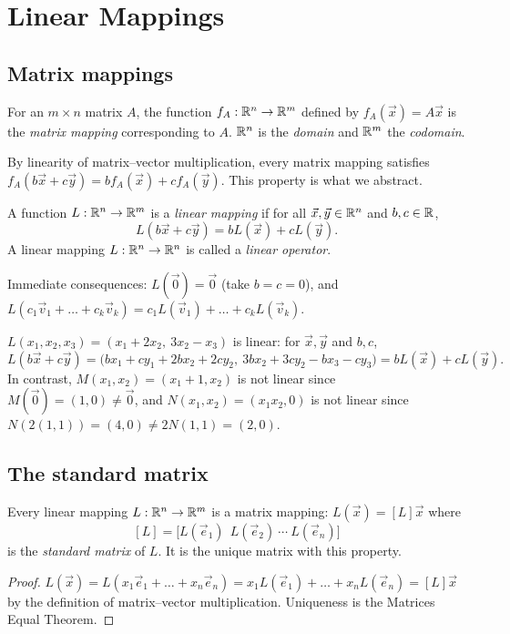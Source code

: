\chapter{Linear Mappings}

\section{Matrix mappings}

\begin{definition}
For an $m\times n$ matrix $A$, the function $f_A:\mathbb{R}^n\to\mathbb{R}^m$ defined by $f_A(\vec x)=A\vec x$ is the
\emph{matrix mapping} corresponding to $A$. $\mathbb{R}^n$ is the \emph{domain} and $\mathbb{R}^m$ the
\emph{codomain}.
\end{definition}

By linearity of matrix--vector multiplication, every matrix mapping satisfies
$f_A(b\vec x+c\vec y)=bf_A(\vec x)+cf_A(\vec y)$. This property is what we abstract.

\begin{definition}
A function $L:\mathbb{R}^n\to\mathbb{R}^m$ is a \emph{linear mapping} if for all $\vec x,\vec y\in\mathbb{R}^n$ and
$b,c\in\mathbb{R}$,
\[
  L(b\vec x + c\vec y) = bL(\vec x)+cL(\vec y).
\]
A linear mapping $L:\mathbb{R}^n\to\mathbb{R}^n$ is called a \emph{linear operator}.
\end{definition}

Immediate consequences: $L(\vec 0)=\vec 0$ (take $b=c=0$), and
$L(c_1\vec v_1+\dots+c_k\vec v_k)=c_1L(\vec v_1)+\dots+c_kL(\vec v_k)$.

\begin{example}
$L(x_1,x_2,x_3)=(x_1+2x_2,\ 3x_2-x_3)$ is linear: for $\vec x,\vec y$ and $b,c$,
\[
L(b\vec x+c\vec y)=\big(bx_1+cy_1+2bx_2+2cy_2,\ 3bx_2+3cy_2-bx_3-cy_3\big)=bL(\vec x)+cL(\vec y).
\]
In contrast, $M(x_1,x_2)=(x_1+1,x_2)$ is not linear since $M(\vec0)=(1,0)\neq\vec 0$, and
$N(x_1,x_2)=(x_1x_2, 0)$ is not linear since $N(2(1,1))=(4,0)\ne 2N(1,1)=(2,0)$.
\end{example}

\section{The standard matrix}

\begin{theorem}
Every linear mapping $L:\mathbb{R}^n\to\mathbb{R}^m$ is a matrix mapping: $L(\vec x)=[L]\vec x$ where
\[
  [L] = \big[L(\vec e_1)\ \ L(\vec e_2)\ \cdots\ L(\vec e_n)\big]
\]
is the \emph{standard matrix} of $L$. It is the unique matrix with this property.
\end{theorem}
\begin{proof}
$L(\vec x)=L(x_1\vec e_1+\dots+x_n\vec e_n)=x_1L(\vec e_1)+\dots+x_nL(\vec e_n)=[L]\vec x$ by the
definition of matrix--vector multiplication. Uniqueness is the Matrices Equal Theorem.
\end{proof}

